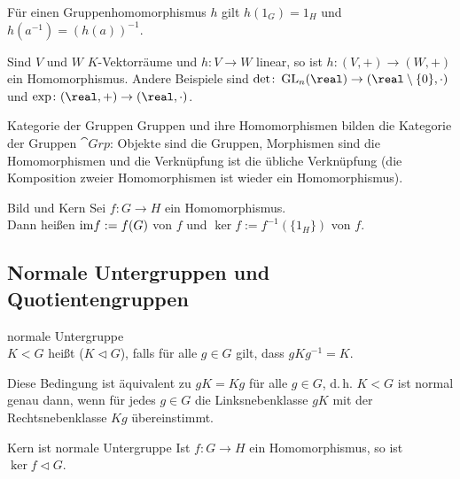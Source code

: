 \begin{Bem}
    Für einen Gruppenhomomorphismus $h$ gilt $h(1_G) = 1_H$ und
    $h(a^{-1}) = (h(a))^{-1}$.
\end{Bem}

\begin{Bsp}
    Sind $V$ und $W$ $K$-Vektorräume und $h\colon V \rightarrow W$ linear,
    so ist $h\colon (V, +) \rightarrow (W, +)$ ein Homomorphismus.
    Andere Beispiele sind
    $\det\colon \GL_n(\real) \rightarrow (\real \setminus \{0\}, \cdot)$ und
    $\exp\colon (\real, +) \rightarrow (\real, \cdot)$.
\end{Bsp}

\begin{Def}{Kategorie der Gruppen}
    Gruppen und ihre Homomorphismen bilden die Kategorie der Gruppen
    $\cat{Grp}$:
    Objekte sind die Gruppen, Morphismen sind die Homomorphismen und
    die Verknüpfung ist die übliche Verknüpfung (die Komposition zweier
    Homomorphismen ist wieder ein Homomorphismus).
\end{Def}

\linie

\begin{Def}{Bild und Kern}
    Sei $f\colon G \rightarrow H$ ein Homomorphismus. \\
    Dann heißen $\text{im} f := f(G)$  von $f$ und
    $\ker f := f^{-1}(\{1_H\})$  von $f$.
\end{Def}

\subsection{%
    Normale Untergruppen und Quotientengruppen%
}

\begin{Def}{normale Untergruppe}\\
    $K < G$ heißt  ($K \vartriangleleft G$), falls
    für alle $g \in G$ gilt, dass $gKg^{-1} = K$.
\end{Def}

\begin{Bem}
    Diese Bedingung ist äquivalent zu $gK = Kg$ für alle $g \in G$, d.\,h.
    $K < G$ ist normal genau dann, wenn für jedes $g \in G$ die
    Linksnebenklasse $gK$ mit der Rechtsnebenklasse $Kg$ übereinstimmt.
\end{Bem}

\begin{Satz}{Kern ist normale Untergruppe}
    Ist $f\colon G \rightarrow H$ ein Homomorphismus, so ist
    $\ker f \vartriangleleft G$.
\end{Satz}

